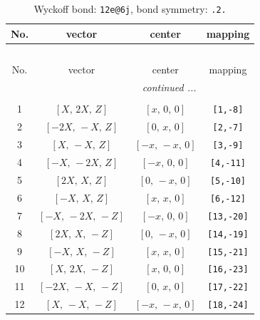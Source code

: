 \documentclass[fleqn,8pt]{jsarticle}
\begin{document}
\begin{longtable}{cccc}
\caption{Wyckoff bond: {\tt 12e@6j}, bond symmetry: {\tt .2.}}
 \\
 \hline \hline
No. & vector & center & mapping \\ \hline \endfirsthead

\multicolumn{3}{l}{\tablename\ \thetable{}} \\
 \hline \hline
No. & vector & center & mapping \\ \hline \endhead

 \hline \hline
\multicolumn{3}{r}{\footnotesize\it continued ...} \\ \endfoot

 \hline \hline
\multicolumn{3}{r}{} \\ \endlastfoot

1 & $\left[ X,\, 2 X,\, Z \right]$ & $\left[ x,\, 0,\, 0 \right]$ & {\tt [1,-8]} \\ \hline
2 & $\left[ - 2 X,\, - X,\, Z \right]$ & $\left[ 0,\, x,\, 0 \right]$ & {\tt [2,-7]} \\ \hline
3 & $\left[ X,\, - X,\, Z \right]$ & $\left[ - x,\, - x,\, 0 \right]$ & {\tt [3,-9]} \\ \hline
4 & $\left[ - X,\, - 2 X,\, Z \right]$ & $\left[ - x,\, 0,\, 0 \right]$ & {\tt [4,-11]} \\ \hline
5 & $\left[ 2 X,\, X,\, Z \right]$ & $\left[ 0,\, - x,\, 0 \right]$ & {\tt [5,-10]} \\ \hline
6 & $\left[ - X,\, X,\, Z \right]$ & $\left[ x,\, x,\, 0 \right]$ & {\tt [6,-12]} \\ \hline
7 & $\left[ - X,\, - 2 X,\, - Z \right]$ & $\left[ - x,\, 0,\, 0 \right]$ & {\tt [13,-20]} \\ \hline
8 & $\left[ 2 X,\, X,\, - Z \right]$ & $\left[ 0,\, - x,\, 0 \right]$ & {\tt [14,-19]} \\ \hline
9 & $\left[ - X,\, X,\, - Z \right]$ & $\left[ x,\, x,\, 0 \right]$ & {\tt [15,-21]} \\ \hline
10 & $\left[ X,\, 2 X,\, - Z \right]$ & $\left[ x,\, 0,\, 0 \right]$ & {\tt [16,-23]} \\ \hline
11 & $\left[ - 2 X,\, - X,\, - Z \right]$ & $\left[ 0,\, x,\, 0 \right]$ & {\tt [17,-22]} \\ \hline
12 & $\left[ X,\, - X,\, - Z \right]$ & $\left[ - x,\, - x,\, 0 \right]$ & {\tt [18,-24]} \\
\end{longtable}
\renewcommand{\arraystretch}{1.2}
\end{document}
